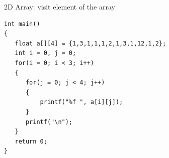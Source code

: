 \begin{frame}[fragile]{2D Array: visit element of the array}
\begin{lstlisting}[xleftmargin=0.08\linewidth, linewidth=0.85\linewidth]
int main()
{
   float a[][4] = {1,3,1,1,1,2,1,3,1,12,1,2};
   int i = 0, j = 0;
   for(i = 0; i < 3; i++)
   {
      for(j = 0; j < 4; j++)
      {
          printf("%f ", a[i][j]);
      }
      printf("\n");
   }
   return 0;
}
\end{lstlisting}
\end{frame}